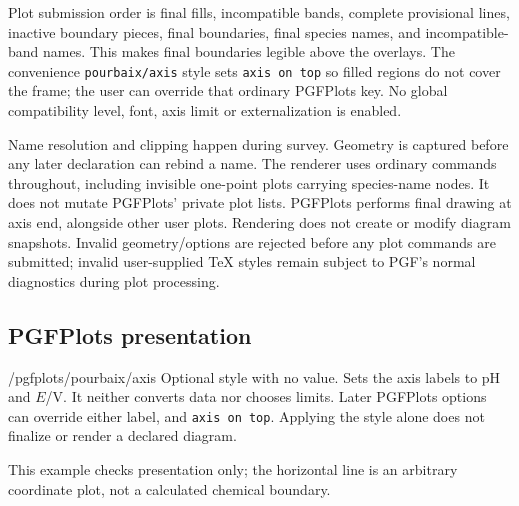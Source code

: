 \documentclass[a4paper,11pt]{ltxdoc}
\begin{document}
Plot submission order is final fills, incompatible bands, complete provisional
lines, inactive boundary pieces, final boundaries, final species names, and
incompatible-band names. This makes final boundaries legible above the overlays.
The convenience \texttt{pourbaix/axis} style sets \texttt{axis on top} so filled
regions do not cover the frame; the user can override that ordinary PGFPlots key.
No global compatibility level, font, axis limit or externalization is enabled.

Name resolution and clipping happen during survey. Geometry is captured before
any later declaration can rebind a name. The renderer uses ordinary 
commands throughout, including invisible one-point plots carrying species-name
nodes. It does not mutate PGFPlots' private plot lists. PGFPlots performs final
drawing at axis end, alongside other user plots. Rendering does not create or
modify diagram snapshots. Invalid geometry/options are rejected before any
plot commands are submitted; invalid user-supplied TeX styles remain subject to
PGF's normal diagnostics during plot processing.

\subsection{PGFPlots presentation}
\begin{key}{/pgfplots/pourbaix/axis}
Optional style with no value. Sets the axis labels to pH and $E$/V. It neither
converts data nor chooses limits. Later PGFPlots options can override either
label, and \texttt{axis on top}. Applying the style alone does not finalize or
render a declared diagram.
\end{key}
This example checks presentation only; the horizontal line is an arbitrary
coordinate plot, not a calculated chemical boundary.
\begin{codeexample}[width=6cm]
\end{codeexample}
\end{document}
